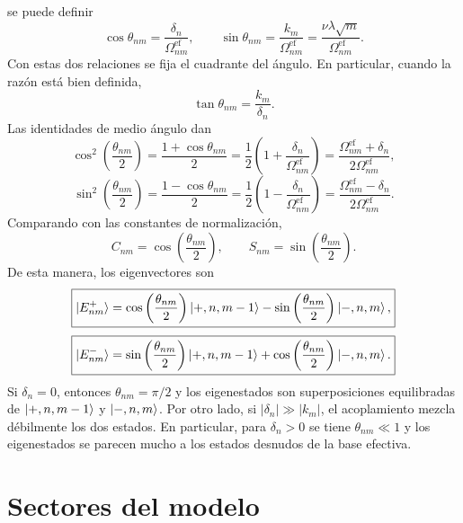 \documentclass[11pt]{article}
\begin{document}
se puede definir
\begin{equation}
  \cos\theta_{nm}
  =
  \frac{\delta_n}{\Omega_{nm}^{\mathrm{ef}}},
  \qquad
  \sin\theta_{nm}
  =
  \frac{k_m}{\Omega_{nm}^{\mathrm{ef}}}
  =
  \frac{\nu\lambda\sqrt m}{\Omega_{nm}^{\mathrm{ef}}}.
\end{equation}
Con estas dos relaciones se fija el cuadrante del \'angulo. En particular,
cuando la raz\'on est\'a bien definida,
\begin{equation}
  \tan\theta_{nm}=\frac{k_m}{\delta_n}.
\end{equation}
Las identidades de medio \'angulo dan
\begin{equation}
  \cos^2\left(\frac{\theta_{nm}}{2}\right)
  =
  \frac{1+\cos\theta_{nm}}{2}
  =
  \frac{1}{2}
  \left(
  1+\frac{\delta_n}{\Omega_{nm}^{\mathrm{ef}}}
  \right)
  =
  \frac{\Omega_{nm}^{\mathrm{ef}}+\delta_n}
  {2\Omega_{nm}^{\mathrm{ef}}},
\end{equation}
\begin{equation}
  \sin^2\left(\frac{\theta_{nm}}{2}\right)
  =
  \frac{1-\cos\theta_{nm}}{2}
  =
  \frac{1}{2}
  \left(
  1-\frac{\delta_n}{\Omega_{nm}^{\mathrm{ef}}}
  \right)
  =
  \frac{\Omega_{nm}^{\mathrm{ef}}-\delta_n}
  {2\Omega_{nm}^{\mathrm{ef}}}.
\end{equation}
Comparando con las constantes de normalizaci\'on,
\begin{equation}
  C_{nm}
  =
  \cos\left(\frac{\theta_{nm}}{2}\right),
  \qquad
  S_{nm}
  =
  \sin\left(\frac{\theta_{nm}}{2}\right).
\end{equation}
De esta manera, los eigenvectores son
\begin{equation}
  \boxed{
  \ket{E_{nm}^{+}}
  =
  \cos\left(\frac{\theta_{nm}}{2}\right)\ket{+,n,m-1}
  -
  \sin\left(\frac{\theta_{nm}}{2}\right)\ket{-,n,m},
  }
\end{equation}
\begin{equation}
  \boxed{
  \ket{E_{nm}^{-}}
  =
  \sin\left(\frac{\theta_{nm}}{2}\right)\ket{+,n,m-1}
  +
  \cos\left(\frac{\theta_{nm}}{2}\right)\ket{-,n,m}.
  }
\end{equation}
Si $\delta_n=0$, entonces $\theta_{nm}=\pi/2$ y los eigenestados son
superposiciones equilibradas de $\ket{+,n,m-1}$ y $\ket{-,n,m}$. Por otro lado,
si $|\delta_n|\gg |k_m|$, el acoplamiento mezcla d\'ebilmente los dos estados.
En particular, para $\delta_n>0$ se tiene $\theta_{nm}\ll1$ y los eigenestados
se parecen mucho a los estados desnudos de la base efectiva.

\section{Sectores del modelo}
\end{document}
